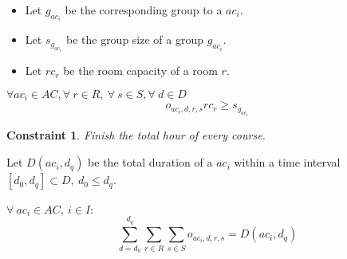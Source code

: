 \documentclass[12pt,a4paper]{article}
\newtheorem{theorem}{Constraint}
\begin{document}
\begin{itemize}
	\item Let $g_{ac_{i}}$ be the corresponding group to a ${ac_{i}}$.
	\item Let $s_{g_{ac_{i}}}$ be the group size of a group $g_{ac_{i}}$.
	\item Let $rc_r$ be the room capacity of a room $r$.
\end{itemize}

$
\forall ac_i \in AC, \forall \ r \in R, \ \forall \ s \in S, \forall \ d \in D 
$
\begin{equation}
o_{ac_i, d, r, s}rc_r \geq  s_{g_{ac_{i}}}
\end{equation}

\begin{theorem}
Finish the total hour of every course.
\end{theorem}
Let $D(ac_i, d_q)$ be the total duration of a $ac_i$ within a time interval $\left[d_0, d_q\right] \subset D, \ d_0 \leq d_q$. \\ \\
$
\forall \ ac_{i} \in AC, \ i \in I :
$ \\
\begin{equation}
\sum_{d = d_0 }^{d_q}\sum_{r \in R}\sum_{s \in S} {o_{ac_{i}, d, r, s}} = D(ac_{i}, d_q)
\end{equation}
\end{document}
